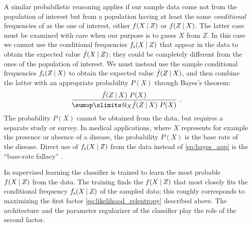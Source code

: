 \documentclass[\ifafour a4paper,12pt,\else a5paper,10pt,\fi%
onecolumn,oneside,article,%
british%
]{memoir}
\makeatletter
\newcommand*{\widefbox}[1]{\fbox{\hspace{1em}#1\hspace{1em}}}
\theoremstyle{remark}
\theoremstyle{innote}
\def\sum{\DOTSI\sumop\slimits@}
\newcommand*{\de}{\partialup}%
\newcommand*{\p}{\mathrm{p}}%
\renewcommand*{\|}[1][]{\nonscript\:#1\vert\nonscript\:\mathopen{}}
\newcommand*{\sect}{\S}%
\newcommand*{\tsum}{\mathop{\textstyle\sum}\nolimits}
\newcommand*{\fs}{f_{\textrm{s}}}
\newcommand*{\uf}{\bar{f}}
\makeatother
\begin{document}
A similar probabilistic reasoning applies if our sample data come not from
the population of interest but from a population having at least the same
\emph{conditional} frequencies of as the one of interest, either
$f(X \| Z)$ or $f(Z \| X)$. The latter case must be examined with care when
our purpose is to guess $X$ from $Z$. In this case we cannot use the
conditional frequencies $\fs(X \| Z)$ that appear in the data to obtain the
expected value $\uf(X \| Z)$: they could be completely different from the
ones of the population of interest. We must instead use the sample
conditional frequencies $\fs(Z \| X)$ to obtain the expected value
$\uf(Z \| X)$, and then combine the latter with an appropriate probability
$P(X)$ through Bayes's theorem:
\begin{equation}
  \label{eq:bayes_app}
  \frac{\uf(Z \| X)\ P(X)}{\sum_{X} \uf(Z \| X)\ P(X)} \ .
\end{equation}
The probability $P(X)$ cannot be obtained from the data, but requires a separate study or survey. In medical applications, where $X$ represents for example the presence or absence of a disease, the probability $P(X)$ is the base rate of the disease. Direct use of $\fs(X \| Z)$ from the data instead of \eqref{eq:bayes_app} is the \enquote{base-rate fallacy} \autocites[\sect~12.5]{russelletal1995_r2022}{axelsson2000,jennyetal2018}.




In supervised learning the classifier is trained to learn the most probable $f(X \| Z)$ from the data. The training finds the $f(X \| Z)$ that most closely fits the conditional frequency $\fs(X \| Z)$ of the sampled data; this roughly corresponds to maximizing the first factor \eqref{eq:likelihood_relentropy} described above. The architecture and the parameter regularizer of the classifier play the role of the second factor.




\end{document}
